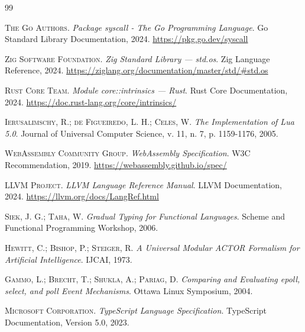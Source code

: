 \documentclass[12pt,a4paper]{article}
\theoremstyle{definition}
\begin{document}
\begin{thebibliography}{99}

\textsc{The Go Authors}.
\textit{Package syscall - The Go Programming Language}.
Go Standard Library Documentation, 2024.
\url{https://pkg.go.dev/syscall}

\textsc{Zig Software Foundation}.
\textit{Zig Standard Library — std.os}.
Zig Language Reference, 2024.
\url{https://ziglang.org/documentation/master/std/\#std.os}

\textsc{Rust Core Team}.
\textit{Module core::intrinsics — Rust}.
Rust Core Documentation, 2024.
\url{https://doc.rust-lang.org/core/intrinsics/}

\textsc{Ierusalimschy, R.; de Figueiredo, L. H.; Celes, W.}
\textit{The Implementation of Lua 5.0}.
Journal of Universal Computer Science, v. 11, n. 7, p. 1159-1176, 2005.

\textsc{WebAssembly Community Group}.
\textit{WebAssembly Specification}.
W3C Recommendation, 2019.
\url{https://webassembly.github.io/spec/}

\textsc{LLVM Project}.
\textit{LLVM Language Reference Manual}.
LLVM Documentation, 2024.
\url{https://llvm.org/docs/LangRef.html}

\textsc{Siek, J. G.; Taha, W.}
\textit{Gradual Typing for Functional Languages}.
Scheme and Functional Programming Workshop, 2006.

\textsc{Hewitt, C.; Bishop, P.; Steiger, R.}
\textit{A Universal Modular ACTOR Formalism for Artificial Intelligence}.
IJCAI, 1973.

\textsc{Gammo, L.; Brecht, T.; Shukla, A.; Pariag, D.}
\textit{Comparing and Evaluating epoll, select, and poll Event Mechanisms}.
Ottawa Linux Symposium, 2004.

\textsc{Microsoft Corporation}.
\textit{TypeScript Language Specification}.
TypeScript Documentation, Version 5.0, 2023.

\end{thebibliography}
\end{document}
